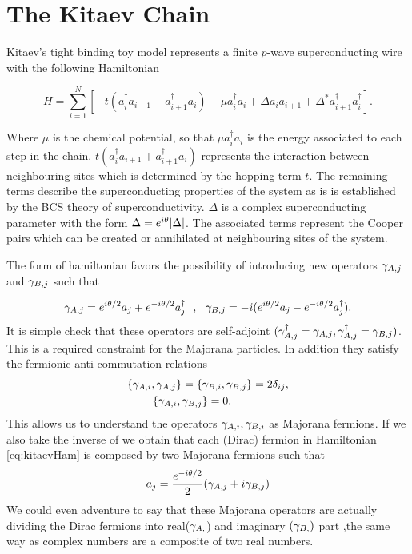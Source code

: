 


\section{The Kitaev Chain \label{sec:KitaevChain}{}}

Kitaev's tight binding toy model  represents a  finite $p$-wave superconducting wire with the following Hamiltonian

\begin{equation}
H = \sum_{i=1}^N \left[ -t(a_i^{\dagger} a_{i+1} + a_{i+1}^{\dagger}a_i) -\mu a_i^{\dagger} a_{i} +  \Delta a_{i}a_{i+1} + \Delta^* a_{i+1}^{\dagger}a_i^{\dagger} \right].  \label{eq:kitaevHam}
\end{equation}

Where $\mu$ is the chemical potential, so that $\mu a_i^{\dagger} a_{i}$ is the energy associated to each step in the chain. $t(a_i^{\dagger} a_{i+1} + a_{i+1}^{\dagger}a_i)$ represents the interaction between neighbouring sites which is determined by the hopping term $t$. The remaining terms describe the superconducting properties of the system as is is established by the BCS theory of superconductivity. $\Delta$ is a complex superconducting parameter with the form  $\Delta = e^{i\theta} \vert \Delta \vert$. The associated terms represent the Cooper pairs which can be created or annihilated at neighbouring sites of the system.

The form of hamiltonian  favors the possibility of introducing new operators $\gamma_{A,j}$ and $\gamma_{B,j}$ such that

\begin{equation}
\gamma_{A,j} = e^{i\theta /2}a_j+ e^{-i\theta/2 } a^{\dagger}_j \ \ , \ \ \gamma_{B,j} = -i(e^{i\theta /2}a_j - e^{-i\theta/2} a^{\dagger}_j).
\label{eq:MajoranaTrans}
\end{equation}
It is simple check that these operators are self-adjoint $(\gamma_{A,j}^\dagger = \gamma_{A,j}, \gamma_{A,j}^\dagger = \gamma_{B,j})$. This is a required constraint for the Majorana particles. In addition they satisfy the fermionic anti-commutation relations
\begin{equation}
\begin{aligned}
\{\gamma_{A,i}, \gamma_{A,j}\} = \{ & \gamma_{B,i} , \gamma_{B,j}\} = 2\delta_{ij}  ,\\ 
  \{\gamma_{A,i}, \gamma_{B,j} & \} =0.
\end{aligned} 
\label{MajoranaRel}
\end{equation} 
This allows us to understand the operators $\gamma_{A,i} , \gamma_{B,i}$ as Majorana fermions. If we also take the inverse of  we obtain that each  (Dirac) fermion in Hamiltonian \eqref{eq:kitaevHam} is composed by two Majorana fermions such that 
$$a_j = \frac{e^{-i\theta/2}}{2}(\gamma_{A,j}+ i\gamma_{B,j})$$
We could even adventure to say that these Majorana operators are actually dividing the Dirac fermions into real($\gamma_{A,}$) and imaginary $(\gamma_{B,})$ part ,the same way as complex numbers are a composite of two real numbers. 

